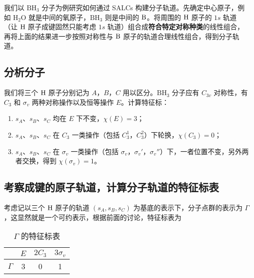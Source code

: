 
我们以 $\text{BH}_3$ 分子为例研究如何通过 SALCs 构建分子轨道。先确定中心原子，例如 $\text{H}_2\text{O}$ 就是中间的氧原子，$\text{BH}_3$ 则是中间的 $\text B$。将周围的 $\text H$ 原子的 $1s$ 轨道（让 $\text H$ 原子成键固然只能考虑 $1s$ 轨道）组合成\textbf{符合特定对称种类}的线性组合，再将上面的结果进一步按照对称性与 $\text B$ 原子的轨道合理线性组合，得到分子轨道。
\subsection{分析分子}

我们将三个 $\text H$ 原子分别记为 $A$，$B$，$C$ 用以区分。$\text{BH}_3$ 分子应有 $C_{3v}$ 对称性，有 $C_3$ 和 $\sigma_v$ 两种对称操作以及恒等操作 $E$。计算特征标：
\begin{enumerate}
\item $s_A$、$s_B$、$s_C$ 均在 $E$ 下不变，$\chi(E)=3$；
\item $s_A$、$s_B$、$s_C$ 在 $C_3$ 一类操作（包括 $C_3^1$，$C_3^2$）下轮换，$\chi(C_3)=0$；
\item $s_A$、$s_B$、$s_C$ 在 $\sigma_v$ 一类操作（包括 $\sigma_v$，$\sigma_v'$，$\sigma_v''$）下，一者位置不变，另外两者交换，得到 $\chi(\sigma_v)=1$。
\end{enumerate}

\subsection{考察成键的原子轨道，计算分子轨道的特征标表}
考虑记以三个 $\text H$ 原子的轨道 $(s_A,s_B,s_C)$ 为基底的表示下，分子点群的表示为 $\Gamma$，这显然就是一个可约表示，根据前面的讨论，特征标表为
\begin{table}[ht]
\centering
\caption{$\Gamma$ 的特征标表}\label{tab_SALCs1}
\begin{tabular}{|c|c|c|c|}
\hline
 & $E$ & $2C_3$ & $3\sigma_v$ \\
\hline
$\Gamma$ & 3 & 0 & 1 \\
\hline
\end{tabular}
\end{table}
